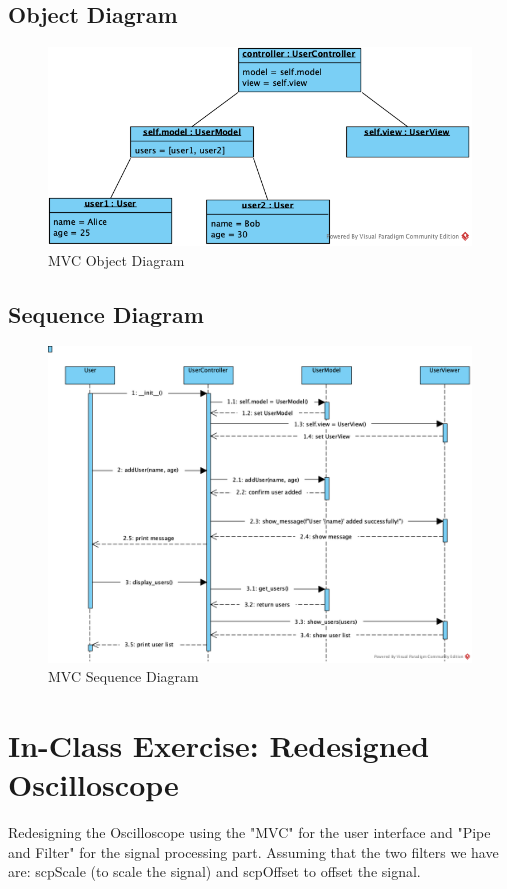 \subsection{Object Diagram}
\begin{figure}[H]
    \centering
    \includegraphics[scale=0.7]{Book-SSW565/jpg/ArchitecturePatterns/ScenarioObjectDiagram.png}
    \caption{\label{Figure::MVC Object Diagram}MVC Object Diagram}
\end{figure}

\subsection{Sequence Diagram}
\begin{figure}[H]
    \centering
    \includegraphics[scale=0.7]{Book-SSW565/jpg/ArchitecturePatterns/MVCSequenceDiagram.png}
    \caption{\label{Figure::MVC Sequence Diagram}MVC Sequence Diagram}
\end{figure}


\section{In-Class Exercise: Redesigned Oscilloscope}
Redesigning the Oscilloscope using the "MVC" for the user interface and "Pipe and Filter" for the signal processing part. Assuming that the two filters we have are: scpScale (to scale the signal) and scpOffset to offset the signal.

